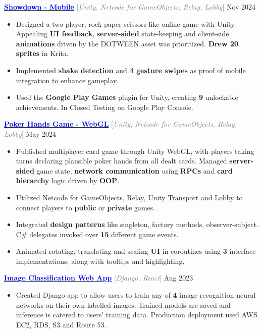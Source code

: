 \documentclass[9pt]{developercv} %
\begin{document}
\begin{minipage}[t]{\textwidth}
	\vspace{-\baselineskip}
	\textbf{\href{https://youtube.com/shorts/Q4wsoV7939M}{\textcolor{blue}{Showdown - Mobile}}} \quad \textcolor{gray}{[\;\textit{Unity, Netcode for GameObjects, Relay, Lobby}\;]} \hfill Nov 2024
	\begin{itemize}[noitemsep,topsep=0pt]
		\item Designed a two-player, rock-paper-scissors-like online game with Unity. Appealing \textbf{UI feedback},
		\textbf{server-sided} state-keeping and client-side \textbf{animations} driven by the DOTWEEN asset was prioritized.
		\textbf{Drew 20 sprites} in Krita.
		\item Implemented \textbf{shake detection} and \textbf{4 gesture swipes} as proof of mobile integration to enhance gameplay.
		\item Used the \textbf{Google Play Games} plugin for Unity, creating \textbf{9} unlockable achievements. In Closed Testing on Google Play Console.
	\end{itemize}
	\vspace{0.3em}

	\textbf{\href{https://henryhu.dev/pokerbsgame/index.html}{\textcolor{blue}{Poker Hands Game - WebGL}}} \quad \textcolor{gray}{[\;\textit{Unity, Netcode for GameObjects, Relay, Lobby}\;]} \hfill May 2024
	\begin{itemize}[noitemsep,topsep=0pt]
		\item Published multiplayer card game through Unity WebGL, with players taking turns declaring plausible poker hands from all dealt cards. Managed \textbf{server-sided} game state,
		\textbf{network communication} using \textbf{RPCs} and \textbf{card hierarchy} logic driven by \textbf{OOP}.
		\item Utilized Netcode for GameObjects, Relay, Unity Transport and Lobby to connect players to \textbf{public} or \textbf{private} games.
		\item Integrated \textbf{design patterns} like singleton, factory methods, observer-subject. C\# delegates invoked over \textbf{15} different game events.
		\item Animated rotating, translating and scaling \textbf{UI} in coroutines using \textbf{3} interface implementations, along with tooltips and highlighting.
	\end{itemize}
	\vspace{0.3em}

	\textbf{\href{https://uclassify.henryhu.dev}{\textcolor{blue}{Image Classification Web App}}} \quad \textcolor{gray}{[\;\textit{Django, React}\;]} \hfill Aug 2023
	\begin{itemize}[noitemsep,topsep=0pt]
		\item Created Django app to allow users to train any of \textbf{4} image recognition neural networks on
		their own labelled images. Trained models are saved and inference is catered to users'
		training data. Production deployment used AWS EC2, RDS, S3 and Route 53.
	\end{itemize}
	\vspace{0.3em}


\end{minipage}
\end{document}

